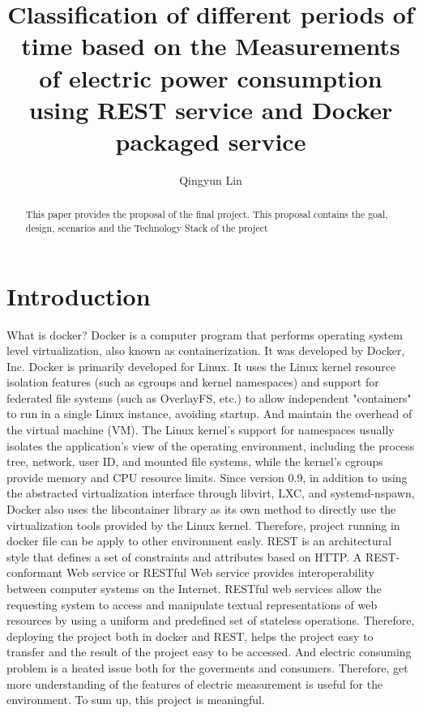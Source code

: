 
\title{Classification of different periods of time based on the Measurements of electric power consumption using REST service and Docker packaged service}


\author{Qingyun Lin}


\renewcommand{\shortauthors}{G. v. Laszewski}


\begin{abstract}
This paper provides the proposal of the final project. This proposal contains the goal, design, scenarios and the Technology Stack of the project
\end{abstract}



\maketitle

\section{Introduction}

What is docker? Docker is a computer program that performs operating system level virtualization, also known as containerization. It was developed by Docker, Inc. Docker is primarily developed for Linux. It uses the Linux kernel resource isolation features (such as cgroups and kernel namespaces) and support for federated file systems (such as OverlayFS, etc.) to allow independent "containers" to run in a single Linux instance, avoiding startup. And maintain the overhead of the virtual machine (VM). The Linux kernel's support for namespaces usually isolates the application's view of the operating environment, including the process tree, network, user ID, and mounted file systems, while the kernel's cgroups provide memory and CPU resource limits. Since version 0.9, in addition to using the abstracted virtualization interface through libvirt, LXC, and systemd-nspawn, Docker also uses the libcontainer library as its own method to directly use the virtualization tools provided by the Linux kernel. Therefore, project running in docker file can be apply to other environment easly. REST is an architectural style that defines a set of constraints and attributes based on HTTP. A REST-conformant Web service or RESTful Web service provides interoperability between computer systems on the Internet. RESTful web services allow the requesting system to access and manipulate textual representations of web resources by using a uniform and predefined set of stateless operations. Therefore, deploying the project both in docker and REST, helps the project easy to transfer and the result of the project easy to be accessed. And electric consuming problem is a heated issue both for the goverments and consumers. Therefore, get more understanding of the features of electric measurement is useful for the environment. To sum up, this project is meaningful.


